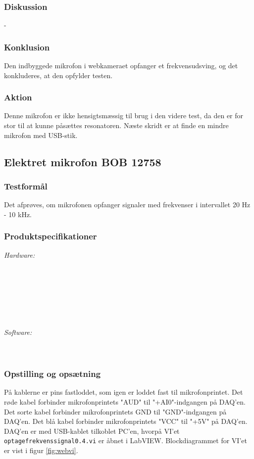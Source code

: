 		\subsubsection{Diskussion} 
		-
		\subsubsection{Konklusion}
		Den indbyggede mikrofon i webkameraet opfanger et frekvensudsving, og det konkluderes, at den opfylder testen. 
		
		\subsubsection{Aktion}
		Denne mikrofon er ikke hensigtsmæssig til brug i den videre test, da den er for stor til at kunne påsættes resonatoren. Næste skridt er at finde en mindre mikrofon med USB-stik. 
		
\subsection{Elektret mikrofon BOB 12758}
		\subsubsection{Testformål}
		Det afprøves, om mikrofonen opfanger signaler med frekvenser i intervallet 20 Hz - 10 kHz.
		
		\subsubsection{Produktspecifikationer}
	
			\textit{Hardware:}\\
			\elektret\\
			\pinstre\\
			\mikrofonkabel\\
			\krympeflex\\
			\daq\\
			\daqusb\\			
			\PC\\
	
			\textit{Software:}\\
			\labview\\
			\daqsoft\\
	
		\subsubsection{Opstilling og opsætning}
		På kablerne er pins fastloddet, som igen er loddet fast til mikrofonprintet. Det røde kabel forbinder mikrofonprintets "AUD" til "+AI0"-indgangen på DAQ'en. Det sorte kabel forbinder mikrofonprintets GND til "GND"-indgangen på DAQ'en. Det blå kabel forbinder mikrofonprintets "VCC" til "+5V" på DAQ'en. DAQ'en er med USB-kablet tilkoblet PC'en, hvorpå VI'et \texttt{optagefrekvenssignal0.4.vi} er åbnet i LabVIEW. Blockdiagrammet for VI'et er vist i figur \ref{fig:webvi}.   
		
